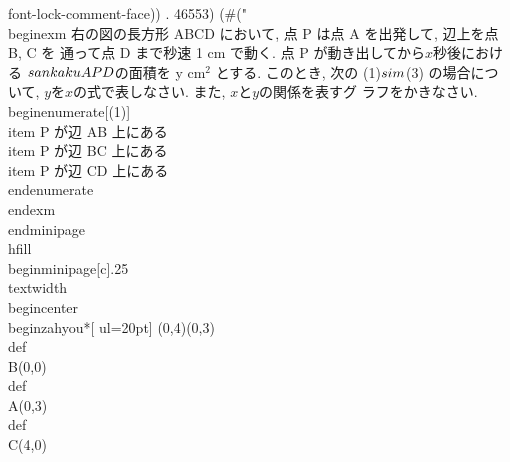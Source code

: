 font-lock-comment-face)) . 46553) (#("%
 \\begin{exm}
  右の図の長方形 ABCD において, 点 P は点 A を出発して, 辺上を点 B, C を
  通って点 D まで秒速 1 cm で動く. 点 P が動き出してから$x$秒後における
  $\\sankaku{APD}$の面積を y cm$^2$ とする. このとき, 次の (1)$\\sim$(3)
  の場合について, $y$を$x$の式で表しなさい. また, $x$と$y$の関係を表すグ
  ラフをかきなさい.
  \\begin{enumerate}[(1)]
   \\item P が辺 AB 上にある
   \\item P が辺 BC 上にある
   \\item P が辺 CD 上にある
  \\end{enumerate}
 \\end{exm}
\\end{minipage}
\\hfill
\\begin{minipage}[c]{.25\\textwidth}
 \\begin{center}
  \\begin{zahyou*}[%
   ul=20pt]
   (0,4)(0,3)%
   \\def\\B{(0,0)}
   \\def\\A{(0,3)}
   \\def\\C{(4,0)}
